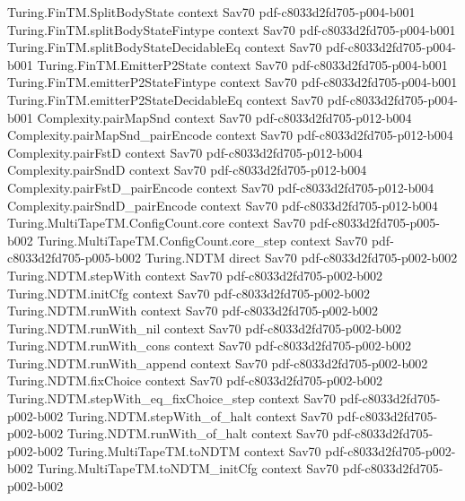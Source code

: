 \begin{theorem}
\proofstep
  {Turing.FinTM.SplitBodyState}
  {context}
  {Sav70}
  {pdf-c8033d2fd705-p004-b001}
\proofstep
  {Turing.FinTM.splitBodyStateFintype}
  {context}
  {Sav70}
  {pdf-c8033d2fd705-p004-b001}
\proofstep
  {Turing.FinTM.splitBodyStateDecidableEq}
  {context}
  {Sav70}
  {pdf-c8033d2fd705-p004-b001}
\proofstep
  {Turing.FinTM.EmitterP2State}
  {context}
  {Sav70}
  {pdf-c8033d2fd705-p004-b001}
\proofstep
  {Turing.FinTM.emitterP2StateFintype}
  {context}
  {Sav70}
  {pdf-c8033d2fd705-p004-b001}
\proofstep
  {Turing.FinTM.emitterP2StateDecidableEq}
  {context}
  {Sav70}
  {pdf-c8033d2fd705-p004-b001}
\proofstep
  {Complexity.pairMapSnd}
  {context}
  {Sav70}
  {pdf-c8033d2fd705-p012-b004}
\proofstep
  {Complexity.pairMapSnd_pairEncode}
  {context}
  {Sav70}
  {pdf-c8033d2fd705-p012-b004}
\proofstep
  {Complexity.pairFstD}
  {context}
  {Sav70}
  {pdf-c8033d2fd705-p012-b004}
\proofstep
  {Complexity.pairSndD}
  {context}
  {Sav70}
  {pdf-c8033d2fd705-p012-b004}
\proofstep
  {Complexity.pairFstD_pairEncode}
  {context}
  {Sav70}
  {pdf-c8033d2fd705-p012-b004}
\proofstep
  {Complexity.pairSndD_pairEncode}
  {context}
  {Sav70}
  {pdf-c8033d2fd705-p012-b004}
\proofstep
  {Turing.MultiTapeTM.ConfigCount.core}
  {context}
  {Sav70}
  {pdf-c8033d2fd705-p005-b002}
\proofstep
  {Turing.MultiTapeTM.ConfigCount.core_step}
  {context}
  {Sav70}
  {pdf-c8033d2fd705-p005-b002}
\proofstep
  {Turing.NDTM}
  {direct}
  {Sav70}
  {pdf-c8033d2fd705-p002-b002}
\proofstep
  {Turing.NDTM.stepWith}
  {context}
  {Sav70}
  {pdf-c8033d2fd705-p002-b002}
\proofstep
  {Turing.NDTM.initCfg}
  {context}
  {Sav70}
  {pdf-c8033d2fd705-p002-b002}
\proofstep
  {Turing.NDTM.runWith}
  {context}
  {Sav70}
  {pdf-c8033d2fd705-p002-b002}
\proofstep
  {Turing.NDTM.runWith_nil}
  {context}
  {Sav70}
  {pdf-c8033d2fd705-p002-b002}
\proofstep
  {Turing.NDTM.runWith_cons}
  {context}
  {Sav70}
  {pdf-c8033d2fd705-p002-b002}
\proofstep
  {Turing.NDTM.runWith_append}
  {context}
  {Sav70}
  {pdf-c8033d2fd705-p002-b002}
\proofstep
  {Turing.NDTM.fixChoice}
  {context}
  {Sav70}
  {pdf-c8033d2fd705-p002-b002}
\proofstep
  {Turing.NDTM.stepWith_eq_fixChoice_step}
  {context}
  {Sav70}
  {pdf-c8033d2fd705-p002-b002}
\proofstep
  {Turing.NDTM.stepWith_of_halt}
  {context}
  {Sav70}
  {pdf-c8033d2fd705-p002-b002}
\proofstep
  {Turing.NDTM.runWith_of_halt}
  {context}
  {Sav70}
  {pdf-c8033d2fd705-p002-b002}
\proofstep
  {Turing.MultiTapeTM.toNDTM}
  {context}
  {Sav70}
  {pdf-c8033d2fd705-p002-b002}
\proofstep
  {Turing.MultiTapeTM.toNDTM_initCfg}
  {context}
  {Sav70}
  {pdf-c8033d2fd705-p002-b002}

\end{theorem}
